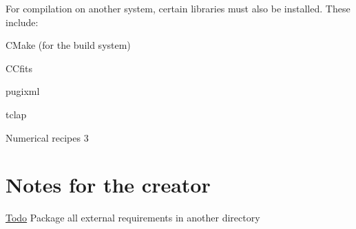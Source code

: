 For compilation on another system, certain libraries must also be installed. These include: \begin{DoxyItemize}
\item CMake (for the build system) \item CCfits \item pugixml \item tclap \item Numerical recipes 3\end{DoxyItemize}
\hypertarget{index_notes}{}\section{Notes for the creator}\label{index_notes}
\begin{Desc}
\item[\hyperlink{todo__todo000001}{Todo}]Package all external requirements in another directory\end{Desc}
